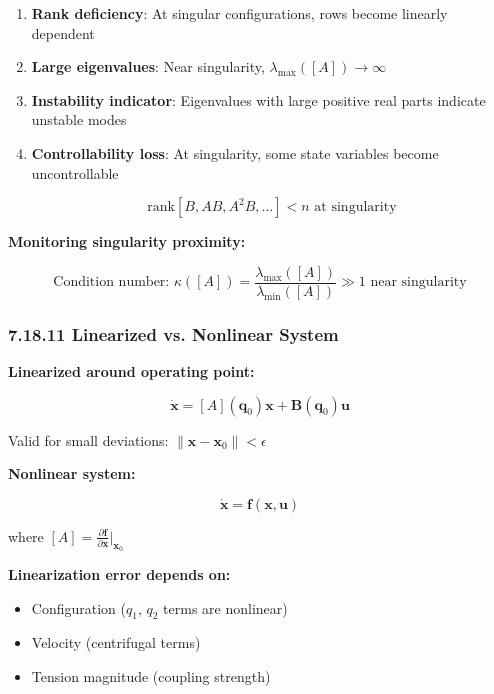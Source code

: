 \begin{enumerate}
    \item \textbf{Rank deficiency}: At singular configurations, rows become linearly dependent
    
    \item \textbf{Large eigenvalues}: Near singularity, $\lambda_{\max}([A]) \to \infty$
    
    \item \textbf{Instability indicator}: Eigenvalues with large positive real parts indicate unstable modes
    
    \item \textbf{Controllability loss}: At singularity, some state variables become uncontrollable
    
    \begin{equation}
    \text{rank}[B, AB, A^2B, \ldots] < n \text{ at singularity}
    \end{equation}
\end{enumerate}

\textbf{Monitoring singularity proximity:}

\begin{equation}
\text{Condition number: } \kappa([A]) = \frac{\lambda_{\max}([A])}{\lambda_{\min}([A])} \gg 1 \text{ near singularity}
\end{equation}

\subsubsection{7.18.11 Linearized vs. Nonlinear System}

\textbf{Linearized around operating point:}

\begin{equation}
\dot{\mathbf{x}} = [A](\mathbf{q}_0) \mathbf{x} + \mathbf{B}(\mathbf{q}_0) \mathbf{u}
\end{equation}

Valid for small deviations: $\|\mathbf{x} - \mathbf{x}_0\| < \epsilon$

\textbf{Nonlinear system:}

\begin{equation}
\dot{\mathbf{x}} = \mathbf{f}(\mathbf{x}, \mathbf{u})
\end{equation}

where $[A] = \frac{\partial \mathbf{f}}{\partial \mathbf{x}}\big|_{\mathbf{x}_0}$

\textbf{Linearization error depends on:}
\begin{itemize}
    \item Configuration ($q_1$, $q_2$ terms are nonlinear)
    \item Velocity (centrifugal terms)
    \item Tension magnitude (coupling strength)
\end{itemize}

